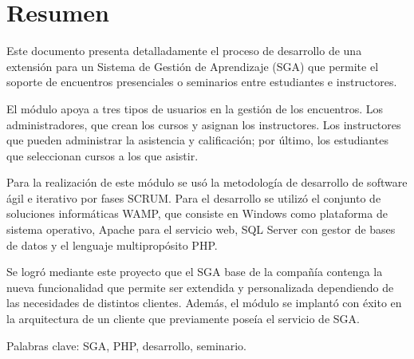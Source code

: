 \chapter*{Resumen}

Este documento presenta detalladamente el proceso de desarrollo de una extensión para un Sistema de Gestión de Aprendizaje (SGA) que permite el soporte de encuentros presenciales o seminarios entre estudiantes e instructores. 

El módulo apoya a tres tipos de usuarios en la gestión de los encuentros. Los administradores, que crean los cursos y asignan los instructores. Los instructores que pueden administrar la asistencia y calificación; por último, los estudiantes que seleccionan cursos a los que asistir.

Para la realización de este módulo se usó la metodología de desarrollo de software ágil e iterativo por fases SCRUM. Para el desarrollo se utilizó el conjunto de soluciones informáticas WAMP, que consiste en Windows como plataforma de sistema operativo, Apache para el servicio web, SQL Server con gestor de bases de datos y el lenguaje multipropósito PHP.

Se logró mediante este proyecto que el SGA base de la compañía contenga la nueva funcionalidad que permite ser extendida y personalizada dependiendo de las necesidades de distintos clientes. Además, el módulo se implantó con éxito en la arquitectura de un cliente que previamente poseía el servicio de SGA.

Palabras clave: SGA, PHP, desarrollo, seminario.




